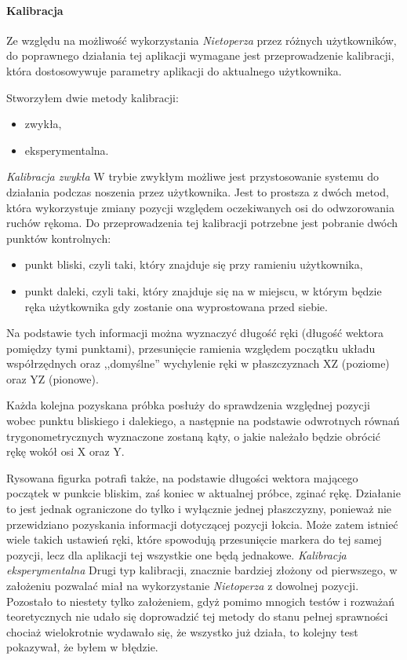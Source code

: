 \paragraph{Kalibracja}
Ze względu na możliwość wykorzystania \textsl{Nietoperza} przez różnych użytkowników, do poprawnego działania tej aplikacji wymagane jest przeprowadzenie kalibracji, która dostosowywuje parametry aplikacji do aktualnego użytkownika.

Stworzyłem dwie metody kalibracji:
\begin{itemize}
  \item zwykła,
  \item eksperymentalna.
\end{itemize}

\noindent\textsl{Kalibracja zwykła} W trybie zwykłym możliwe jest przystosowanie systemu do działania podczas noszenia przez użytkownika. Jest to prostsza z dwóch metod, która wykorzystuje zmiany pozycji względem oczekiwanych osi do odwzorowania ruchów rękoma. Do przeprowadzenia tej kalibracji potrzebne jest pobranie dwóch punktów kontrolnych:
\begin{itemize}
  \item punkt bliski, czyli taki, który znajduje się przy ramieniu użytkownika,
  \item punkt daleki, czyli taki, który znajduje się na w miejscu, w którym będzie ręka użytkownika gdy zostanie ona wyprostowana przed siebie.
\end{itemize}

Na podstawie tych informacji można wyznaczyć długość ręki (długość wektora pomiędzy tymi punktami), przesunięcie ramienia względem początku układu współrzędnych oraz ,,domyślne'' wychylenie ręki w płaszczyznach XZ (poziome) oraz YZ (pionowe).

Każda kolejna pozyskana próbka posłuży do sprawdzenia względnej pozycji wobec punktu bliskiego i dalekiego, a następnie na podstawie odwrotnych równań trygonometrycznych wyznaczone zostaną kąty, o jakie należało będzie obrócić rękę wokół osi X oraz Y.

Rysowana figurka potrafi także, na podstawie długości wektora mającego początek w punkcie bliskim, zaś koniec w aktualnej próbce, zginać rękę. Działanie to jest jednak ograniczone do tylko i wyłącznie jednej płaszczyzny, ponieważ nie przewidziano pozyskania informacji dotyczącej pozycji łokcia. Może zatem istnieć wiele takich ustawień ręki, które spowodują przesunięcie markera do tej samej pozycji, lecz dla aplikacji tej wszystkie one będą jednakowe.
\newline
\newline
\textsl{Kalibracja eksperymentalna} Drugi typ kalibracji, znacznie bardziej złożony od pierwszego, w założeniu pozwalać miał na wykorzystanie \textsl{Nietoperza} z dowolnej pozycji. Pozostało to niestety tylko założeniem, gdyż pomimo mnogich testów i rozważań teoretycznych nie udało się doprowadzić tej metody do stanu pełnej sprawności \ppauza chociaż wielokrotnie wydawało się, że wszystko już działa, to kolejny test pokazywał, że byłem w błędzie.

